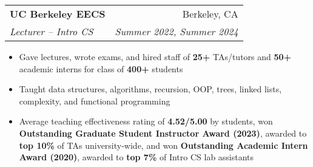 \documentclass[letterpaper,11pt]{article}
\makeatletter
\newcommand{\resumeItem}[1]{
  \item\small{
    {#1 \vspace{-4pt}}
  }
}
\newcommand{\resumeSubheading}[4]{
  \vspace{-2pt}\item
    \begin{tabular*}{0.97\textwidth}[t]{l@{\extracolsep{\fill}}r}
      \textbf{#1} & #2 \\
      \textit{\small#3} & \textit{\small #4} \\
    \end{tabular*}\vspace{-8pt}
}
\newcommand{\resumeItemListStart}{\begin{itemize}[leftmargin=0.2in]}
\newcommand{\resumeItemListEnd}{\end{itemize}\vspace{-5pt}}
\makeatother
\begin{document}
    \resumeSubheading
    {UC Berkeley EECS}{Berkeley, CA}{Lecturer – Intro CS}{Summer 2022, Summer 2024}
    \resumeItemListStart
        \resumeItem{Gave lectures, wrote exams, and hired staff of \textbf{25+} TAs/tutors and \textbf{50+} academic interns for class of \textbf{400+} students}
        \resumeItem{Taught data structures, algorithms, recursion, OOP, trees, linked lists, complexity, and functional programming}
        \resumeItem{Average teaching effectiveness rating of \textbf{4.52/5.00} by students, won \textbf{Outstanding Graduate Student Instructor Award (2023)}, awarded to \textbf{top 10\%} of TAs university-wide, and won \textbf{Outstanding Academic Intern Award (2020)}, awarded to \textbf{top 7\%} of Intro CS lab assistants}
    \resumeItemListEnd



\end{document}
